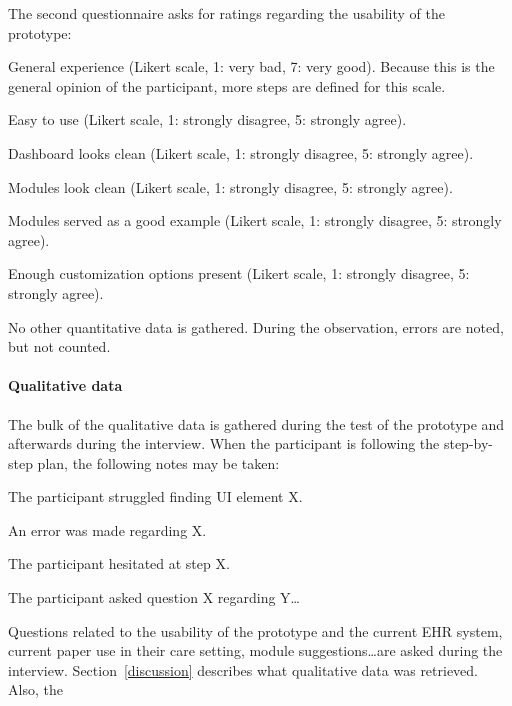     \noindent The second questionnaire asks for ratings regarding the usability of the prototype: 
    \vspace{-6pt}
    \begin{myitemize}
        \item General experience (Likert scale, 1: very bad, 7: very good). Because this is the general opinion of the participant, more steps are defined for this scale.
        \item Easy to use (Likert scale, 1: strongly disagree, 5: strongly agree).
        \item Dashboard looks clean (Likert scale, 1: strongly disagree, 5: strongly agree).
        \item Modules look clean (Likert scale, 1: strongly disagree, 5: strongly agree).
        \item Modules served as a good example (Likert scale, 1: strongly disagree, 5: strongly agree).
        \item Enough customization options present (Likert scale, 1: strongly disagree, 5: strongly agree).
    \end{myitemize}

    \noindent No other quantitative data is gathered. During the observation, errors are noted, but not counted.

    \paragraph{Qualitative data} The bulk of the qualitative data is gathered during the test of the prototype and afterwards during the interview. When the participant is following the step-by-step plan, the following notes may be taken:
    \vspace{-6pt}
    \begin{myitemize}
        \item The participant struggled finding UI element X.
        \item An error was made regarding X.
        \item The participant hesitated at step X.
        \item The participant asked question X regarding Y\ldots
    \end{myitemize}

    \noindent Questions related to the usability of the prototype and the current EHR system, current paper use in their care setting, module suggestions\ldots are asked during the interview. Section~\ref{discussion} describes what qualitative data was retrieved. Also, the 

